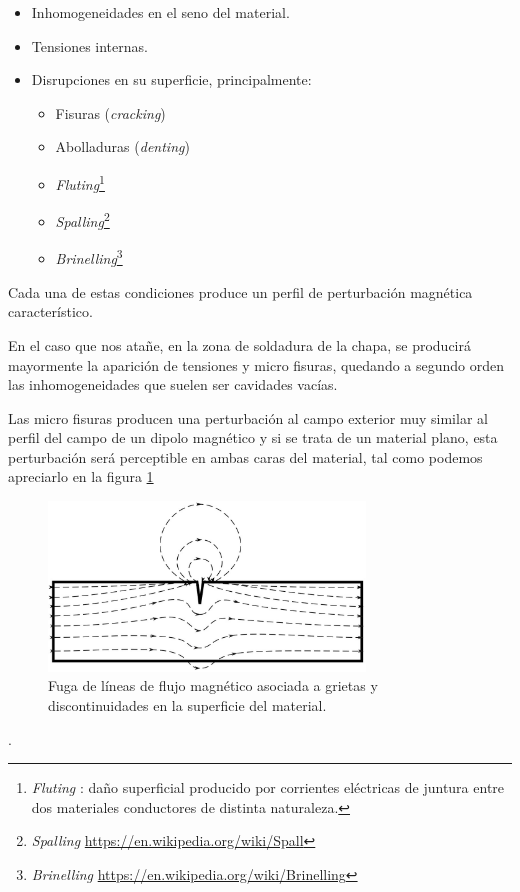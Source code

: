 \begin{itemize}
	\item Inhomogeneidades en el seno del material.
	\item Tensiones internas.
	\item Disrupciones en su superficie, principalmente:
		\begin{itemize}
			\item Fisuras (\textit{cracking})
			\item Abolladuras (\textit{denting})
			\item \textit{Fluting}\footnote{\textit{Fluting }: daño superficial producido por corrientes eléctricas de juntura entre dos materiales conductores de distinta naturaleza.}
			\item \textit{Spalling}\footnote{\textit{Spalling} \url{https://en.wikipedia.org/wiki/Spall}}
			\item \textit{Brinelling}\footnote{\textit{Brinelling} \url{https://en.wikipedia.org/wiki/Brinelling}}
	\end{itemize}			
\end{itemize}

Cada una de estas condiciones produce un perfil de perturbación magnética característico. 

En el caso que nos atañe, en la zona de soldadura de la chapa, se producirá mayormente la aparición de tensiones y micro fisuras, quedando a segundo orden las inhomogeneidades que suelen ser cavidades vacías. 

Las micro fisuras producen una perturbación al campo exterior muy similar al perfil del campo de un dipolo magnético y si se trata de un material plano, esta perturbación será perceptible en ambas caras del material, tal como podemos apreciarlo en la figura \ref{fig:MMM_dispersion0}


\begin{figure}[h]
	\centering
	\includegraphics[width=0.75\textwidth]{./Figures/MMM_dispersion}
	\caption{Fuga de líneas de flujo magnético asociada a grietas y discontinuidades en la superficie del material.}
	\label{fig:MMM_dispersion0}
\end{figure}. 

